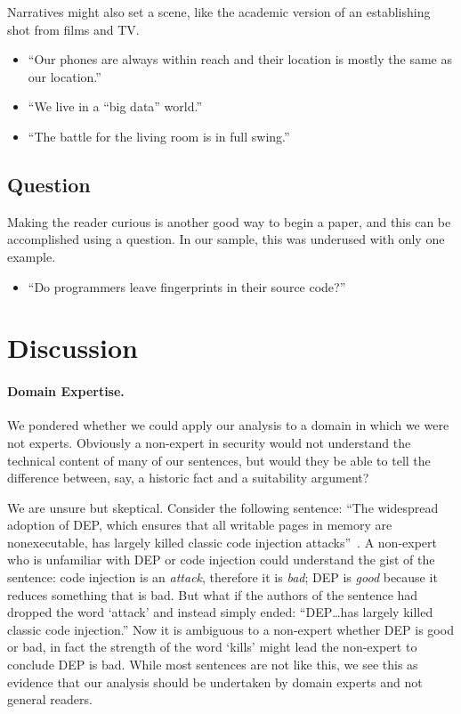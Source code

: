 \documentclass[sigconf]{acmart}
\begin{document}
	Narratives might also set a scene, like the academic version of an establishing shot from films and TV.

	\begin{itemize}

		\item 	``Our phones are always within reach and their location is mostly the same as our location.''~\cite{michalevsky2015powerspy}

		\item 	``We live in a “big data” world.''~\cite{lecuyer2014xray}

		\item 	``The battle for the living room is in full swing.''~\cite{oren2014aether}
	\end{itemize}


	\subsection{Question}

	Making the reader curious is another good way to begin a paper, and this can be accomplished using a question. In our sample, this was underused with only one example.
	\begin{itemize}
		\item ``Do programmers leave fingerprints in their source code?''~\cite{caliskan2015anonymizing}
	\end{itemize}


	\section{Discussion}
	\label{sec:disc}


	\paragraph{Domain Expertise.} We pondered whether we could apply our analysis to a domain in which we were not experts. Obviously a non-expert in security would not understand the technical content of many of our sentences, but would they be able to tell the difference between, say, a historic fact and a suitability argument?

	We are unsure but skeptical. Consider the following sentence: ``The widespread adoption of DEP, which ensures that all writable pages in memory are nonexecutable, has largely killed classic code injection attacks''~\cite{carlini2014rop}. A non-expert who is unfamiliar with DEP or code injection could understand the gist of the sentence: code injection is an \textit{attack}, therefore it is \textit{bad}; DEP is \textit{good} because it reduces something that is bad. But what if the authors of the sentence had dropped the word `attack' and instead simply ended: ``DEP\ldots has largely killed classic code injection.'' Now it is ambiguous to a non-expert whether DEP is good or bad, in fact the strength of the word `kills' might lead the non-expert to conclude DEP is bad. While most sentences are not like this, we see this as evidence that our analysis should be undertaken by domain experts and not general readers.
\end{document}
